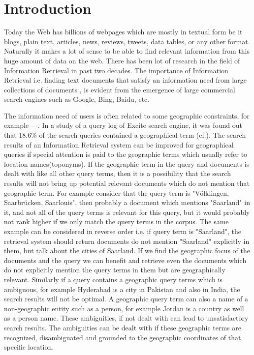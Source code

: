 \documentclass[
     11pt,         %
     a4paper,      %
     oneside,
     ]{article}
\begin{document}
\tableofcontents
\newpage





\section{Introduction}\label{sec:introduction}
Today the Web has billions of webpages which are mostly in textual form be it blogs, plain text, articles, news, reviews, tweets, data tables, or any other format. Naturally it makes a lot of sense to be able to find relevant information from this huge amount of data on the web. There has been lot of research in the field of Information Retrieval in past two decades. The importance of Information Retrieval i.e. finding text documents that satisfy an information need from large collections of documents \cite{Manning:2008:IIR:1394399}, is evident from the emergence of large commercial search engines such as Google, Bing, Baidu, etc.

The information need of users is often related to some geographic constraints, for example ---. In a study of a query log of Excite search engine, it was found out that 18.6\% of the search queries contained a geographical term \cite{Sanderson04analyzinggeographic} (cf.\cite{Leidner:2008:PhD}). The search results of an Information Retrieval system can be improved for geographical queries if special attention is paid to the geographic terms which usually refer to location names(toponyms). If the geographic term in the query and documents is dealt with like all other query terms, then it is a possibility that the search results will not bring up potential relevant documents which do not mention that geographic term. For example consider that the query term is "Völklingen, Saarbrücken, Saarlouis", then probably a document which mentions "Saarland" in it, and not all of the query terms is relevant for this query, but it would probably not rank higher if we only match the query terms in the corpus. The same example can be considered in reverse order i.e. if query term is "Saarland", the retrieval system should return documents do not mention "Saarland" explicitly in them, but talk about the cities of Saarland. If we find the geographic focus of the documents and the query we can benefit and retrieve even the documents which do not explicitly mention the query terms in them but are geographically relevant. Similarly if a query contains a geographic query terms which is ambiguous, for example Hyderabad is a city in Pakistan and also in India, the search results will not be optimal. A geographic query term can also a name of a non-geographic entity such as a person, for example Jordan is a country as well as a person name. These ambiguities, if not dealt with can lead to unsatisfactory search results. The ambiguities can be dealt with if these geographic terms are recognized, disambiguated and grounded to the geographic coordinates of that specific location. 
\end{document}
